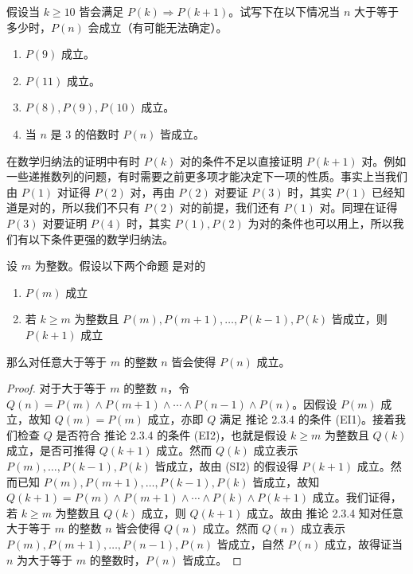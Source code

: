 \begin{question}
假设当 $k \ge 10$ 皆会满足 $P(k) \Rightarrow P(k+1)$。试写下在以下情况当 $n$ 大于等于多少时，$P(n)$ 会成立（有可能无法确定）。
\begin{enumerate}
    \item $P(9)$ 成立。
    \item $P(11)$ 成立。
    \item $P(8), P(9), P(10)$ 成立。
    \item 当 $n$ 是 3 的倍数时 $P(n)$ 皆成立。
\end{enumerate}
\end{question}

在数学归纳法的证明中有时 $P(k)$ 对的条件不足以直接证明 $P(k+1)$ 对。例如一些递推数列的问题，有时需要之前更多项才能决定下一项的性质。事实上当我们由 $P(1)$ 对证得 $P(2)$ 对，再由 $P(2)$ 对要证 $P(3)$ 时，其实 $P(1)$ 已经知道是对的，所以我们不只有 $P(2)$ 对的前提，我们还有 $P(1)$ 对。同理在证得 $P(3)$ 对要证明 $P(4)$ 时，其实 $P(1), P(2)$ 为对的条件也可以用上，所以我们有以下条件更强的数学归纳法。

\begin{corollary}
设 $m$ 为整数。假设以下两个命题 是对的
\begin{enumerate}
    \item[(SI1)] $P(m)$ 成立
    \item[(SI2)] 若 $k \ge m$ 为整数且 $P(m), P(m+1), \ldots , P(k-1), P(k)$ 皆成立，则 $P(k+1)$ 成立
\end{enumerate}
那么对任意大于等于 $m$ 的整数 $n$ 皆会使得 $P(n)$ 成立。
\end{corollary}

\begin{proof}
对于大于等于 $m$ 的整数 $n$，令 $Q(n) = P(m) \land P(m+1) \land \cdots \land P(n-1) \land P(n)$。因假设 $P(m)$ 成立，故知 $Q(m) = P(m)$ 成立，亦即 $Q$ 满足 推论 2.3.4 的条件 (EI1)。接着我们检查 $Q$ 是否符合 推论 2.3.4 的条件 (EI2)，也就是假设 $k \ge m$ 为整数且 $Q(k)$ 成立，是否可推得 $Q(k+1)$ 成立。然而 $Q(k)$ 成立表示 $P(m), \ldots , P(k-1), P(k)$ 皆成立，故由 (SI2) 的假设得 $P(k+1)$ 成立。然而已知 $P(m), P(m+1), \ldots , P(k-1), P(k)$ 皆成立，故知 $Q(k+1) = P(m) \land P(m+1) \land \cdots \land P(k) \land P(k+1)$ 成立。我们证得，若 $k \ge m$ 为整数且 $Q(k)$ 成立，则 $Q(k+1)$ 成立。故由 推论 2.3.4 知对任意大于等于 $m$ 的整数 $n$ 皆会使得 $Q(n)$ 成立。然而 $Q(n)$ 成立表示 $P(m), P(m+1), \ldots , P(n-1), P(n)$ 皆成立，自然 $P(n)$ 成立，故得证当 $n$ 为大于等于 $m$ 的整数时，$P(n)$ 皆成立。
\end{proof}

